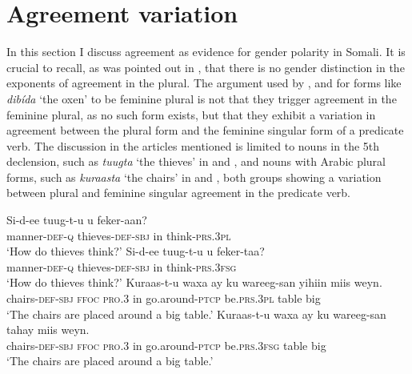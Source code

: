 \documentclass[output=paper]{langsci/langscibook}
\begin{document}
\section{Agreement variation}\label{sec:nilsson:3}

In this section I discuss agreement as evidence for gender polarity in Somali. It is crucial to recall, as was pointed out in , that there is no gender distinction in the exponents of agreement in the plural. The argument used by \citet{Hetzron1972}, \citet{ZwickyPullum1983} and \citet{Lecarme2002} for forms like \textit{dibída} ‘the oxen’ to be feminine plural is not that they trigger agreement in the feminine plural, as no such form exists, but that they exhibit a variation in agreement between the plural form and the feminine singular form of a predicate verb. The discussion in the articles mentioned is limited to nouns in the 5th declension, such as \textit{tuugta} ‘the thieves’ in  and , and nouns with Arabic plural forms, such as \textit{kuraasta} ‘the chairs’ in  and , both groups showing a variation between plural and feminine singular agreement in the predicate verb.

\ea\label{ex:nilsson:2}
\ea\label{ex:nilsson:2a}
\gll Si-d-ee             tuug-t-u             u  feker-aan?\\
       manner-\textsc{def-q} thieves-\textsc{def-sbj} in think-\textsc{prs.3pl}\\
\glt ‘How do thieves think?’
\ex\label{ex:nilsson:2b}
\gll  Si-d-ee             tuug-t-u             u  feker-taa?\\
       manner-\textsc{def-q} thieves-\textsc{def-sbj} in think-\textsc{prs.3fsg}\\
\glt ‘How do thieves think?’
\ex\label{ex:nilsson:2c}
\gll  Kuraas-t-u      waxa  ay     ku wareeg-san       yihiin         miis weyn.\\
       chairs-\textsc{def-sbj} \textsc{ffoc} \textsc{pro.3} in go.around\textsc{-ptcp} be\textsc{.prs.3pl} table big\\
\glt ‘The chairs are placed around a big table.’ 
\ex\label{ex:nilsson:2d}
\gll  Kuraas-t-u      waxa  ay     ku wareeg-san       tahay           miis weyn.\\
       chairs-\textsc{def-sbj} \textsc{ffoc} \textsc{pro.3} in go.around\textsc{-ptcp} be\textsc{.prs.3fsg} table big\\
\glt ‘The chairs are placed around a big table.’ 
\z
\z
\end{document}
